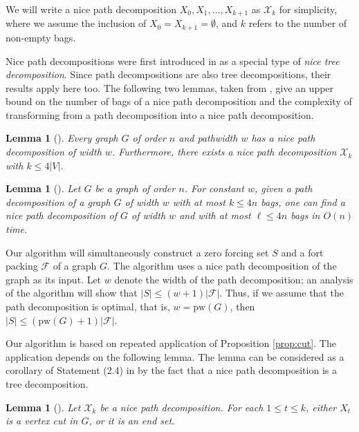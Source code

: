 \documentclass[12pt]{amsart}
\theoremstyle{plain}
\newtheorem{lemma}[theorem]{Lemma}
\theoremstyle{definition}
\def\F{\mathcal F}
\def\X{\mathcal X}
\def\pw{\mathrm{pw}}
\begin{document}
We will write a nice path decomposition $X_0,X_1,\dots, X_{k+1}$ as $\X_k$ for simplicity, where we assume the inclusion of $X_0= X_{k+1} = \emptyset$, and $k$ refers to the number of non-empty bags.


Nice path decompositions were first introduced in \cite{1994pathwidth} as a special type of {\sl nice tree decomposition}. 
Since path decompositions are also tree decompositions, their results apply here too. 
The following two lemmas, taken from \cite{1994pathwidth}, give an upper bound on the number of bags of a nice path decomposition and the complexity of transforming from a path decomposition into a nice path decomposition.
\begin{lemma}
    [{\cite[Lemma 13.1.2]{1994pathwidth}}] 
    Every graph $G$ of order $n$ and pathwidth $w$ has a nice path decomposition of width $w$. 
    Furthermore, there exists a nice path decomposition $\X_k$ with $k\leq 4|V|$.
\end{lemma}
\begin{lemma}[{\cite[Lemma 13.1.3]{1994pathwidth}}]\label{lem:smooth_pw}
    Let $G$ be a graph of order $n$. For constant $w$, given a path decomposition of a graph $G$ of width $w$ with at most $k\leq 4n$ bags, one can find a nice path decomposition of $G$ of width $w$ and with at most $\ell\leq 4n$ bags in $O(n)$ time.
\end{lemma}


Our algorithm will simultaneously construct a zero forcing set $S$ and a fort packing $\F$ of a graph $G$.
The algorithm uses a nice path decomposition of the graph as its input. 
Let $w$ denote the width of the path decomposition; an analysis of the algorithm will show that $|S|\leq (w+1)|\F|$. 
Thus, if we assume that the path decomposition is optimal, that is, $w=\pw(G)$, then $|S|\leq (\pw(G)+1)|\F|$. 


Our algorithm is based on repeated application of Proposition \ref{prop:cut}. The application depends on the following lemma.
The lemma can be considered as a corollary of Statement (2.4) in \cite{robertson1986graph} by the fact that a nice path decomposition is a tree decomposition. 

\begin{lemma}[\cite{robertson1986graph}]\label{lemma:bag-cut}
Let $\X_k$ be a nice path decomposition. For each $1\leq  t\leq k$, either $X_t$ is a vertex cut in $G$, or it is an end set. 
\end{lemma}
\end{document}
